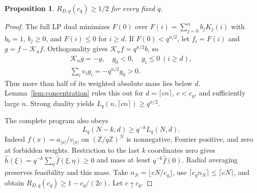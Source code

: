 \documentclass[12pt,letterpaper,onecolumn]{article}
\newtheorem{proposition}[theorem]{Proposition}
\newcommand{\Z}{\mathbb Z}
\newcommand{\K}{\mathcal K}
\begin{document}
\begin{proposition}\label{prop:lower}
$R_{D,q}(c_q)\ge1/2$ for every fixed $q$.
\end{proposition}
\begin{proof}
The full LP dual minimizes $F(0)$ over
$F(i)=\sum_{j=0}^nb_jK_j(i)$ with $b_0=1$, $b_j\ge0$, and $F(i)\le0$ for $i\ge d$. If $F(0)<q^{n/2}$, let $f_i=F(i)$ and $g=f-\K_nf$. Orthogonality gives $\K_nf=q^{n/2}b$, so
\begin{gather*}
\K_ng=-g,\quad g_0<0,\quad g_i\le0\ (i\ge d),\\
\sum_i v_ig_i=-q^{n/2}g_0>0.
\end{gather*}
Thus more than half of its weighted absolute mass lies below $d$. Lemma~\ref{lem:concentration} rules this out for $d=\lceil cn\rceil$, $c<c_q$, and sufficiently large $n$. Strong duality yields $L_q(n,\lceil cn\rceil)\ge q^{n/2}$.

The complete program also obeys
\begin{equation}\label{eq:shorten}
L_q(N-k,d)\ge q^{-k}L_q(N,d).
\end{equation}
Indeed $f(x)=a_{|x|}/v_{|x|}$ on $(\Z/q\Z)^N$ is nonnegative, Fourier positive, and zero at forbidden weights. Restriction to the last $k$ coordinates zero gives
$\widehat h(\xi)=q^{-k}\sum_\eta\widehat f(\xi,\eta)\ge0$ and mass at least $q^{-k}\widehat f(0)$. Radial averaging preserves feasibility and this mass. Take $n_N=\lfloor cN/c_q\rfloor$, use $\lceil c_qn_N\rceil\le\lceil cN\rceil$, and obtain
$R_{D,q}(c_q)\ge1-c_q/(2c)$. Let $c\uparrow c_q$.
\end{proof}
\end{document}
